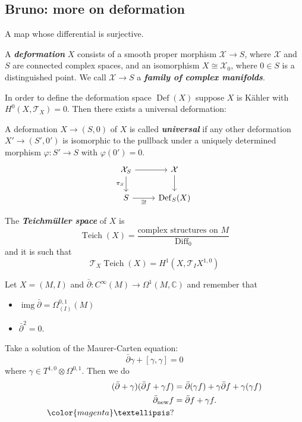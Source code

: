 \subsection{Bruno: more on deformation}
\begin{defn} A map whose differential is surjective.
\end{defn}
\begin{defn}
	A \textbf{\textit{deformation}} $X$ consists of a smooth proper morphism $\mathcal{X} \to S$, where $\mathcal{X}$ and $S$ are connected complex spaces, and an isomorphism $X \cong \mathcal{X}_0$, where $0\in S$ is a distinguished point. We call $\mathcal{X}\to S$ a \textbf{\textit{family of complex manifolds}}.
\end{defn}

In order to define the deformation space $\operatorname{Def}(X)$ suppose $X$ is Kähler with $H^0(X,\mathcal{T}_X)=0$. Then there exists a universal deformation:
\begin{defn}
	A deformation $X\to(S,0)$ of $X$ is called \textbf{\textit{universal}} if any other deformation $X' \to (S',0')$ is isomorphic to the pullback under a uniquely determined morphism $\varphi:S'\to S$ with $\varphi(0')=0$.
	\[\begin{tikzcd}
		\mathcal{X}_S\arrow[d,"\pi_S",swap]\arrow[r]&\mathcal{X}\arrow[d]\\
		S\arrow[r,"\exists!",swap]&\operatorname{Def}_S(X)
	\end{tikzcd}\]
\end{defn}
\begin{defn}
	The \textbf{\textit{Teichmüller space}} of $X$ is
	\[\operatorname{Teich}(X)=\frac{\text{complex structures on }M}{\operatorname{Diff}_0}\]
	and it is such that
	\[\mathcal{T}_X\operatorname{Teich}(X)=H^1(X,\mathcal{T}_IX^{1,0})\]
\end{defn}
\begin{remark}
	Let $X=(M,I)$ and $\bar\partial:C^\infty(M)\to\Omega^1(M,\mathbb{C})$ and remember that
	\begin{itemize}
		\item $\operatorname{img}\bar\partial=\Omega^{0,1}_{(I)}(M)$
		\item $\bar\partial^2=0$.
	\end{itemize}
	Take a solution of the Maurer-Carten equation:
	\[\bar\partial\gamma+[\gamma,\gamma]=0\]
	where $\gamma\in T^{1,0}\otimes\Omega^{0,1}$. Then we do
	\begin{align*}
		(\bar\partial+\gamma)(\bar\partial f+\gamma f)&=\bar\partial(\gamma f)+\gamma\bar\partial f+\gamma(\gamma f)\\
		\bar\partial_{\text{new}}f&=\bar\partial f+\gamma f.\\
		{\color{magenta}…?}
	\end{align*}
\end{remark}
